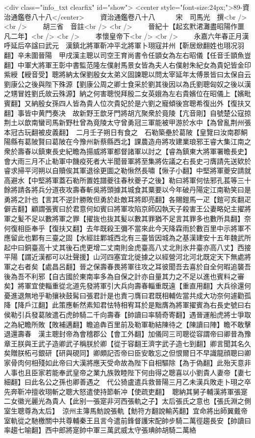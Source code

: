 <div class="info_txt clearfix" id="show">
<center style="font-size:24px;">89-資治通鑑卷八十八</center>
  　　資治通鑑卷八十八　　　宋　司馬光　撰<br />
<br />
　　胡三省　音註<br />
<br />
　　晉紀十【起玄黓涒灘盡昭陽作噩凡二年】<br />
<br />
　　孝懷皇帝下<br />
<br />
　　永嘉六年春正月漢呼延后卒諡曰武元　漢鎮北將軍靳冲平北將軍卜珝寇并州【靳居焮翻姓也珝况羽翻】辛未圍晉陽　甲戌漢主聰以司空王育尚書令任顗女為左右昭儀【任音壬顗魚豈翻】中軍大將軍王彰中書監范隆左僕射馬景女皆為夫人右僕射朱紀女為貴妃皆金印紫綬【綬音受】聰將納太保劉殷女太弟义固諫聰以問太宰延年太傅景皆曰太保自云劉康公之後與陛下殊源【劉康公周之卿士食采於劉其後因以為氏劉聰匈奴之後以漢之甥冒姓劉氏故云殊源】納之何害聰悦拜殷二女英娥為左右貴嬪位在昭儀上【嬪毗賓翻】又納殷女孫四人皆為貴人位次貴妃於是六劉之寵傾後宫聰希復出外【復扶又翻】事皆中黄門奏决　故新野王歆牙門將胡亢聚衆於竟陵【亢音剛】自號楚公寇掠荆土以歆南蠻司馬新野杜曾為竟陵太守曾勇冠三軍能被甲游於水中【為曾亂荆州張本冠古玩翻被皮義翻】　二月壬子朔日有食之　石勒築壘於葛陂【皇覽曰汝南郡鮦陽縣有葛陂賢曰葛陂在今豫州新蔡縣西北】課農造舟將攻建業琅邪王睿大集江南之衆於壽春以鎮東長史紀瞻為揚威將軍都督諸軍以討之【睿為鎮東大將軍署瞻長史】會大雨三月不止勒軍中饑疫死者大半聞晉軍將至集將佐議之右長史刁膺請先送欵於睿求掃平河朔以自贖俟其軍退徐更圖之勒愀然長嘯【愀子小翻】中堅將軍夔安請就高避水【中堅將軍蓋石勒所置姓譜夔往春秋夔子之後】勒曰將軍何怯邪孔萇等三十餘將請各將兵分道夜攻壽春斬吳將頭據其城食其粟要以今年破丹陽定江南勒笑曰是勇將之計也【言其不逆計勝敗但勇於赴敵耳將即亮翻】各賜鎧馬一疋【鎧可亥翻疋僻吉翻】顧謂張賓曰於君意何如賓曰將軍攻陷京師囚執天子殺害王公妻略妃主擢將軍之髪不足以數將軍之罪【擢抜也抜其髪以數其罪猶不足言其罪多也數所具翻】奈何復相臣奉乎【復扶又翻】去年既殺王彌不當來此今天降霖雨於數百里中示將軍不應留此也鄴有三臺之固【水經註鄴城西北有三臺皆因城為之基漢建安十五年魏武所起中曰銅臺高十丈其後石虎更增二丈南則金虎臺高八丈北則氷井臺亦高八丈】西接平陽【謂近漢都可以壯聲援】山河四塞宜北徙據之以經營河北河北既定天下無處將軍之右者矣【處昌呂翻】晉之保壽春畏將軍往攻之耳彼聞吾去喜於自全何暇追襲吾後為吾不利邪【自古國於東南率多為自保之計亦自量其力之不足以進也賓料之審矣】將軍宜使輜重從北道先發將軍引大兵向壽春輜重既遠【重直用翻】大兵徐還何憂進退無地乎勒攘袂鼓髯曰張君計是也責刁膺曰君既相輔佐當共成大功奈何遽勸孤降【降戶江翻】此策應斬然素知君怯特相宥耳於是黜膺為將軍擢賓為右長史號曰右侯勒引兵發葛陂遣石虎帥騎二千向壽春【帥讀曰率騎奇寄翻】遇晉運船虎將士爭取之為紀瞻所敗【敗補邁翻】瞻追犇百里前及勒軍勒結陳待之【陳讀曰陣】瞻不敢擊退還壽春　漢主聰封帝為會稽郡公【會工外翻】加儀同三司聰從容謂帝曰卿昔為豫章王朕與王武子造卿武子稱朕於卿【從于容翻王濟字武子造七到翻】卿言聞其名久矣贈朕柘弓銀研【研與硯同】卿頗記否帝曰臣安敢忘之但恨爾日不早識龍顔聰曰卿家骨肉何相殘如此帝曰大漢將應天受命故為陛下自相驅除【為于偽翻】此殆天意非人事也且臣家若能奉武皇帝之業九族敦睦陛下何由得之聰喜以小劉貴人妻帝【妻七細翻】曰此名公之孫也卿善遇之　代公猗盧遣兵救晉陽三月乙未漢兵敗走卜珝之卒先奔靳冲擅收珝斬之聰大怒遣使持節斬冲【使疏吏翻】　聰納其舅子輔漢將軍張寔二女徽光麗光為貴人【此别一張寔非河西張軌之子】太后張氏之意也【張氏淵之側室生聰尊為太后】　涼州主簿馬魴說張軌【魴符方翻說輸芮翻】宜命將出師翼戴帝室軌從之馳檄關中共尊輔秦王且言今遣前鋒督護宋配帥步騎二萬徑趨長安【帥讀曰率趨七喻翻】西中郎將寔帥中軍三萬武威太守張琠帥胡騎二萬絡